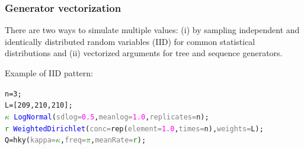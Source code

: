 \documentclass[10pt,letterpaper,table]{article}
\begin{document}
\subsubsection*{Generator vectorization}
There are two ways to simulate multiple values: (i) by sampling independent and identically distributed random variables (IID) for common statistical distributions and (ii) vectorized arguments for tree and sequence generators.

Example of IID pattern: 
{\small
  \begin{alltt}
    n = 3;
    L = [209, 210, 210];
    \textcolor{green}{\(\kappa\)} ~ \textcolor{blue}{LogNormal}(\textcolor{gray}{sdlog=}\textcolor{magenta}{0.5}, \textcolor{gray}{meanlog=}\textcolor{magenta}{1.0}, \textcolor{gray}{replicates=}n);
    \textcolor{green}{r} ~ \textcolor{blue}{WeightedDirichlet}(\textcolor{gray}{conc=}\textcolor{magenta!80!black}{rep}(\textcolor{gray}{element=}\textcolor{magenta}{1.0}, \textcolor{gray}{times=}n), \textcolor{gray}{weights=}L);
    Q = \textcolor{magenta!80!black}{hky}(\textcolor{gray}{kappa=}\textcolor{green}{\(\kappa\)}, \textcolor{gray}{freq=}\textcolor{green}{\(\pi\)}, \textcolor{gray}{meanRate=}\textcolor{green}{r});
  \end{alltt}
}
\end{document}
